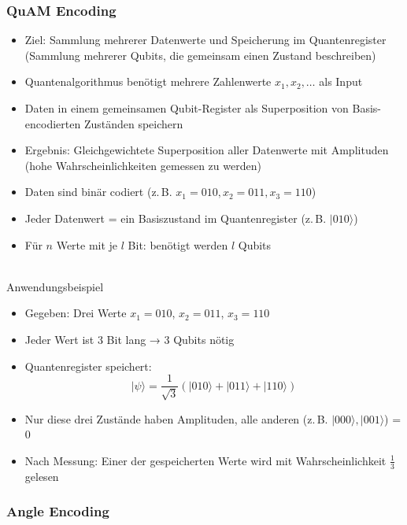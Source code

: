 \subsubsection{QuAM Encoding}
\begin{itemize}
\item Ziel: Sammlung mehrerer Datenwerte und Speicherung im Quantenregister (Sammlung mehrerer Qubits, die gemeinsam einen Zustand beschreiben)
\item Quantenalgorithmus benötigt mehrere Zahlenwerte \( x_1, x_2, \ldots \) als Input
\item Daten in einem gemeinsamen Qubit-Register als Superposition von Basis-encodierten Zuständen speichern
\item Ergebnis: Gleichgewichtete Superposition aller Datenwerte mit Amplituden (hohe Wahrscheinlichkeiten gemessen zu werden)
\item Daten sind binär codiert (z.\,B. \( x_1 = 010, x_2 = 011, x_3 = 110 \))
\item Jeder Datenwert = ein Basiszustand im Quantenregister (z.\,B. \( |010\rangle \))
\item Für \( n \) Werte mit je \( l \) Bit: benötigt werden \( l \) Qubits
\end{itemize}
\cite{Date encoding patterns for quantum computing}
\\


Anwendungsbeispiel
\begin{itemize}
\item Gegeben: Drei Werte \( x_1 = 010 \), \( x_2 = 011 \), \( x_3 = 110 \)
\item Jeder Wert ist 3 Bit lang → 3 Qubits nötig
\item Quantenregister speichert:
  \[
  |\psi\rangle = \frac{1}{\sqrt{3}} (|010\rangle + |011\rangle + |110\rangle)
  \]
\item Nur diese drei Zustände haben Amplituden, alle anderen (z.\,B. \( |000\rangle, |001\rangle \)) = 0
\item Nach Messung: Einer der gespeicherten Werte wird mit Wahrscheinlichkeit \( \frac{1}{3} \) gelesen
\end{itemize}

\subsubsection{Angle Encoding}

